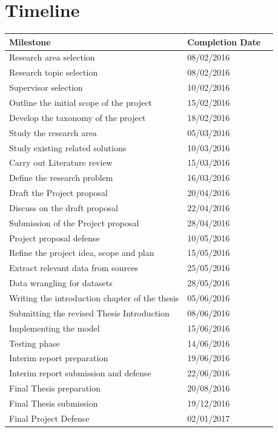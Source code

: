 \documentclass[12pt]{article}
\begin{document}
\section{Timeline}
\begin{table}[]
\small
\begin{tabular}{@{}|l|l|l|@{}}
\toprule
\textbf{Milestone}                             & \textbf{Completion Date}  
\\ \midrule
Research area selection                        & 08/02/2016          
\\ 
Research topic selection                       & 08/02/2016        
\\ 
Supervisor selection                           & 10/02/2016      
\\ 
Outline the initial scope of the project       & 15/02/2016                
 \\ 
Develop the taxonomy of the project            & 18/02/2016
 \\ 
Study the research area                        & 05/03/2016
 \\ 
Study existing related solutions               & 10/03/2016
 \\ 
Carry out Literature review                    & 15/03/2016
 \\ 
Define the research problem                    & 16/03/2016
 \\ 
Draft the Project proposal                     & 20/04/2016
 \\ 
Discuss on the draft proposal                  & 22/04/2016
 \\ 
Submission of the Project proposal             & 28/04/2016
 \\ 
Project proposal defense                       & 10/05/2016
 \\ 
Refine the project idea, scope and plan        & 15/05/2016
 \\ 
Extract relevant data from sources             & 25/05/2016
 \\ 
Data wrangling for datasets                    & 28/05/2016                                                      \\ 
Writing the introduction chapter of the thesis & 05/06/2016
 \\ 
Submitting the revised Thesis Introduction     & 08/06/2016                                 
 \\ 
Implementing the model                         & 15/06/2016
 \\ 
Testing phase                                  & 14/06/2016
 \\ 
Interim report preparation                     & 19/06/2016
 \\ 
Interim report submission and defense          & 22/06/2016
 \\ 
Final Thesis preparation                       & 20/08/2016
 \\ 
Final Thesis submission                        & 19/12/2016
    \\ 
Final Project Defense                          & 02/01/2017 
\\ \bottomrule
\end{tabular}
\end{table}
\clearpage 
\end{document}
